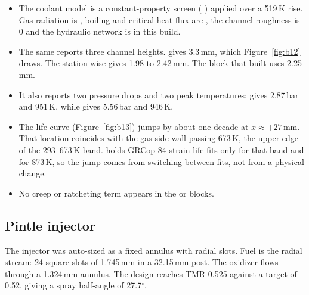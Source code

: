 \begin{itemize}
\item The coolant model is a constant-property screen ( ) applied over a 519\,K rise. Gas radiation is , boiling and critical heat flux are , the channel roughness is 0 and the hydraulic network is  in this build.
\item The same  reports three channel heights.  gives 3.3\,mm, which Figure~\ref{fig:b12} draws. The station-wise  gives 1.98 to 2.42\,mm. The  block that built  uses 2.25\,mm.
\item It also reports two pressure drops and two peak temperatures:  gives 2.87\,bar and 951\,K, while  gives 5.56\,bar and 946\,K.
\item The life curve (Figure~\ref{fig:b13}) jumps by about one decade at $x \approx +27$\,mm. That location coincides with the gas-side wall passing 673\,K, the upper edge of the 293--673\,K band.  holds GRCop-84 strain-life fits only for that band and for 873\,K, so the jump comes from switching between fits, not from a physical change.
\item No creep or ratcheting term appears in the  or  blocks.
\end{itemize}

\subsection{Pintle injector}\label{sec:builds-pic-injector}


The injector was auto-sized as a fixed annulus with radial slots. Fuel is the radial stream: 24 square slots of 1.745\,mm in a 32.15\,mm post. The oxidizer flows through a 1.324\,mm annulus. The design reaches TMR 0.525 against a target of 0.52, giving a spray half-angle of 27.7$^\circ$.

